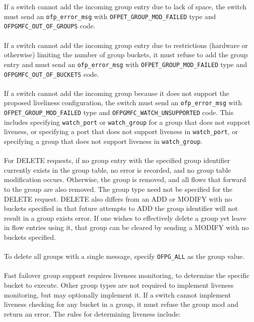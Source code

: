 \documentclass[10pt]{article}
\begin{document}
\\\\
If a switch cannot add the incoming group entry due to lack of space, the switch must send an \verb|ofp_error_msg| with \verb|OFPET_GROUP_MOD_FAILED| type and \verb|OFPGMFC_OUT_OF_GROUPS| code.
\\\\
If a switch cannot add the incoming group entry due to restrictions (hardware or otherwise) limiting the number of group buckets, it must refuse to add the group entry and must send an \verb|ofp_error_msg| with \verb|OFPET_GROUP_MOD_FAILED| type and \verb|OFPGMFC_OUT_OF_BUCKETS| code.
\\\\
If a switch cannot add the incoming group because it does not support the proposed liveliness configuration, the switch must send an \verb|ofp_error_msg| with \verb|OFPET_GROUP_MOD_FAILED| type and \verb|OFPGMFC_WATCH_UNSUPPORTED| code. This includes specifying \verb|watch_port| or \verb|watch_group| for a group that does not support liveness, or specifying a port that does not support liveness in \verb|watch_port|, or specifying a group that does not support liveness in \verb|watch_group|.
\\\\
For DELETE requests, if no group entry with the specified group identifier currently exists in the group table, no error is recorded, and no group table modification occurs.  Otherwise, the group is removed, and all flows that forward to the group are also removed. The group type need not be specified for the DELETE request. DELETE also differs from an ADD or MODIFY with no buckets specified in that future attempts to ADD the group identifier will not result in a group exists error.  If one wishes to effectively delete a group yet leave in flow entries using it, that group can be cleared by sending a MODIFY with no buckets specified.
\\\\
To delete all groups with a single message, specify \verb|OFPG_ALL| as the group value.
\\\\
Fast failover group support requires liveness monitoring, to determine the specific bucket to execute. Other group types are not required to implement liveness monitoring, but may optionally implement it.  If a switch cannot implement liveness checking for any bucket in a group, it must refuse the group mod and return an error.  The rules for determining liveness include:
\end{document}
